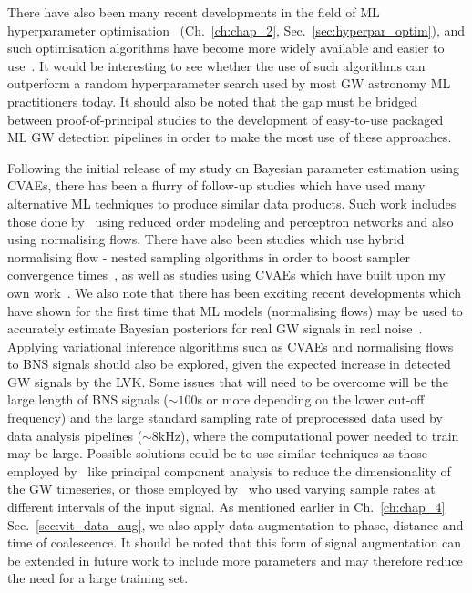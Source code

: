 There have also been many recent developments in the field of 
\ac{ML} hyperparameter
optimisation~\cite{li2019generalized,1206.2944,NIPS2011_86e8f7ab}
(Ch.~\ref{ch:chap_2}, Sec.~\ref{sec:hyperpar_optim}), and such 
optimisation algorithms have become more widely available and 
easier to use~\cite{omalley2019kerastuner}. It would be interesting 
to see whether the use of such algorithms can outperform a  
random hyperparameter search used by most \ac{GW} astronomy 
\ac{ML} practitioners today. 
It should also be noted that the gap must be 
bridged between proof-of-principal studies to the development of 
easy-to-use packaged \ac{ML} \ac{GW} detection pipelines in order to 
make the most use of these approaches. 

Following the initial release of my study on Bayesian parameter 
estimation using \acp{CVAE}, there has been a flurry of follow-up 
studies which have used many alternative \ac{ML} techniques to 
produce similar data products. Such work includes those done
by~\cite{2019arXiv190905966C} using reduced order modeling and 
perceptron networks and also~\cite{PhysRevD.102.104057} using normalising 
flows. There have also been studies which use hybrid normalising flow - 
nested sampling algorithms in order to boost sampler 
convergence times~\cite{PhysRevD.103.103006}, as well as studies using \acp{CVAE} 
which have built upon my own work~\cite{2021arXiv210710730K}. We also note 
that there has been exciting recent developments which have shown for the 
first time that \ac{ML} models (normalising flows) may be used to 
accurately estimate Bayesian posteriors for real \ac{GW} signals in 
real noise~\cite{2008.03312}. Applying variational 
inference algorithms such as \acp{CVAE} and normalising flows to 
\ac{BNS} signals should also be explored, given the expected 
increase in detected \ac{GW} signals by the \ac{LVK}. Some issues that will 
need to be overcome will be the large length of \ac{BNS} signals 
($\sim100$s or more depending on the lower cut-off frequency) and 
the large standard sampling rate of preprocessed data used by data analysis 
pipelines ($\sim8$kHz), where the computational power needed to train 
may be large. Possible solutions could be to use similar techniques as 
those employed by~\cite{PhysRevD.102.104057} like principal component analysis 
to reduce the dimensionality of the \ac{GW} timeseries, or those 
employed by~\cite{PhysRevD.102.063015} who used varying sample rates at 
different intervals of the input signal. As mentioned earlier in 
Ch.~\ref{ch:chap_4} Sec.~\ref{sec:vit_data_aug}, we also apply 
data augmentation to phase, distance and 
time of coalescence. It should be noted that this form of signal augmentation 
can be extended in future work to include more parameters and 
may therefore reduce the need for a large training set.

